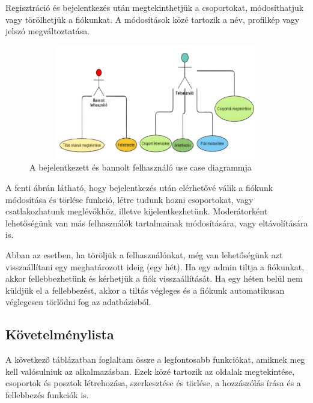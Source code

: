 \documentclass[
]{thesis-ekf}
\theoremstyle{definition}
\theoremstyle{remark}
\begin{document}
Regisztráció és bejelentkezés után megtekinthetjük a csoportokat, módosíthatjuk vagy törölhetjük a fiókunkat. A módosítások közé tartozik a név, profilkép vagy jelszó megváltoztatása.

\begin{figure}[H]
\centering
\includegraphics[width=14cm, height=5cm]{model_1}
\caption{A bejelentkezett és bannolt felhasználó use case diagrammja}
  \label{fig:picture}
\end{figure}

A fenti ábrán látható, hogy bejelentkezés után elérhetővé válik a fiókunk módosítása és törlése funkció, létre tudunk hozni csoportokat, vagy csatlakozhatunk meglévőkhöz, illetve kijelentkezhetünk. Moderátorként lehetőségünk van más felhasználók tartalmainak módosítására, vagy eltávolítására is. 

Abban az esetben, ha töröljük a felhasználónkat, még van lehetőségünk azt visszaállítani egy meghatározott ideig (egy hét). Ha egy admin tiltja a fiókunkat, akkor fellebbezhetünk és kérhetjük a fiók visszaállítását. Ha egy héten belül nem küldjük el a fellebbezést, akkor a tiltás végleges és a fiókunk automatikusan véglegesen törlődni fog az adatbázisból.
\pagebreak
\subsection{Követelménylista}

A következő táblázatban foglaltam össze a legfontosabb funkciókat, amiknek meg kell valósulniuk az alkalmazásban. Ezek közé tartozik az oldalak megtekintése, csoportok és posztok létrehozása, szerkesztése és törlése, a hozzászólás írása és a fellebbezés funkciók is.
\end{document}
